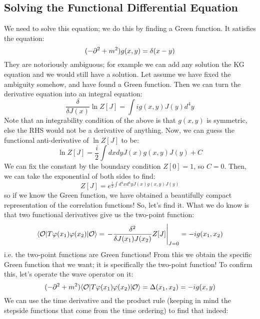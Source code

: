\subsection{Solving the Functional Differential Equation}
We need to solve this equation; we do this by finding a Green function. It satisfies the equation:
\begin{equation}
    (-\partial^2 + m^2)g(x, y) = \delta(x - y)
\end{equation}
They are notoriously ambiguous; for example we can add any solution the KG equation and we would still have a solution. Let assume we have fixed the ambiguity somehow, and have found a Green function. Then we can turn the derivative equation into an integral equation:
\begin{equation}
    \frac{\delta}{\delta J(x)}\ln Z[J] = \int i g(x, y)J(y) d^4y
\end{equation}
Note that an integrability condition of the above is that $g(x, y)$ is symmetric, else the RHS would not be a derivative of anything. 
Now, we can guess the functional anti-derivative of $\ln Z[J]$ to be:
\begin{equation}
    \ln Z[J] = \frac{i}{2}\int dxdy J(x)g(x, y)J(y) + C
\end{equation}
We can fix the constant by the boundary condition $Z[0] = 1$, so $C = 0$. Then, we can take the exponential of both sides to find:
\begin{equation}
    Z[J] = e^{\frac{i}{2}\int d^4x d^4y J(x)g(x, y)J(y)}
\end{equation}
so if we know the Green function, we have obtained a beautifully compact representation of the correlation functions! So, let's find it. What we do know is that two functional derivatives give us the two-point function:
\begin{equation}
    \bra{\O}T\varphi(x_1)\varphi(x_2)\ket{\O} = \left.-\frac{\delta^2}{\delta J(x_1)J(x_2)} Z[J]\right|_{J=0} = -ig(x_1, x_2)
\end{equation}
i.e. the two-point functions are Green functions! From this we obtain the specific Green function that we want; it is specifically the two-point function! To confirm this, let's operate the wave operator on it:
\begin{equation}
    (-\p^2 + m^2)\bra{\O}T\varphi(x_1)\varphi(x_2)\ket{\O} = \Delta(x_1, x_2) = -ig(x, y)
\end{equation}
We can use the time derivative and the product rule (keeping in mind the stepside functions that come from the time ordering) to find that indeed:
